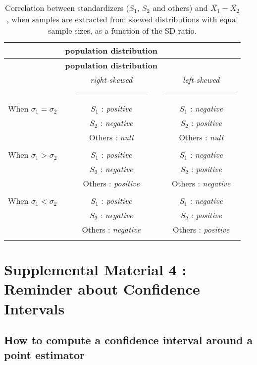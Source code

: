 \documentclass[
  english,
  man,mask,floatsintext]{apa6}
\begin{document}
\newpage

\begin{longtable}[]{@{}lcc@{}}
\caption{Correlation between standardizers (\(S_1\), \(S_2\) and others) and \(\bar{X_1}-\bar{X_2}\), when samples are extracted from skewed distributions with equal sample sizes, as a function of the SD-ratio.}\tabularnewline
\toprule
& \textbf{\textbf{population distribution}} & \\
\midrule
\endfirsthead
\toprule
& \textbf{\textbf{population distribution}} & \\
\midrule
\endhead
& \emph{right-skewed} & \emph{left-skewed} \\
& --------------------------- & --------------------------- \\
When \(\sigma_1=\sigma_2\) & \(S_1\) : \emph{positive} & \(S_1\) : \emph{negative} \\
& \(S_2\) : \emph{negative} & \(S_2\) : \emph{positive} \\
& Others : \emph{null} & Others : \emph{null} \\
& & \\
When \(\sigma_1>\sigma_2\) & \(S_1\) : \emph{positive} & \(S_1\) : \emph{negative} \\
& \(S_2\) : \emph{negative} & \(S_2\) : \emph{positive} \\
& Others : \emph{positive} & Others : \emph{negative} \\
& & \\
When \(\sigma_1<\sigma_2\) & \(S_1\) : \emph{positive} & \(S_1\) : \emph{negative} \\
& \(S_2\) : \emph{negative} & \(S_2\) : \emph{positive} \\
& Others : \emph{negative} & Others : \emph{positive} \\
& & \\
\bottomrule
\end{longtable}

\newpage

\hypertarget{supplemental-material-4-reminder-about-confidence-intervals}{%
\section{Supplemental Material 4 : Reminder about Confidence Intervals}\label{supplemental-material-4-reminder-about-confidence-intervals}}

\hypertarget{how-to-compute-a-confidence-interval-around-a-point-estimator}{%
\subsection{How to compute a confidence interval around a point estimator}\label{how-to-compute-a-confidence-interval-around-a-point-estimator}}
\end{document}
